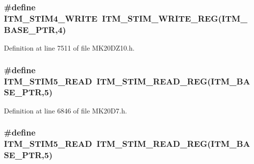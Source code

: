 \subsubsection[{\texorpdfstring{I\+T\+M\+\_\+\+S\+T\+I\+M4\+\_\+\+W\+R\+I\+TE}{ITM_STIM4_WRITE}}]{\setlength{\rightskip}{0pt plus 5cm}\#define I\+T\+M\+\_\+\+S\+T\+I\+M4\+\_\+\+W\+R\+I\+TE~{\bf I\+T\+M\+\_\+\+S\+T\+I\+M\+\_\+\+W\+R\+I\+T\+E\+\_\+\+R\+EG}({\bf I\+T\+M\+\_\+\+B\+A\+S\+E\+\_\+\+P\+TR},4)}\hypertarget{group___i_t_m___register___accessor___macros_ga15f21956568cb77bc35327f9f4742b0f}{}\label{group___i_t_m___register___accessor___macros_ga15f21956568cb77bc35327f9f4742b0f}


Definition at line 7511 of file M\+K20\+D\+Z10.\+h.

\subsubsection[{\texorpdfstring{I\+T\+M\+\_\+\+S\+T\+I\+M5\+\_\+\+R\+E\+AD}{ITM_STIM5_READ}}]{\setlength{\rightskip}{0pt plus 5cm}\#define I\+T\+M\+\_\+\+S\+T\+I\+M5\+\_\+\+R\+E\+AD~{\bf I\+T\+M\+\_\+\+S\+T\+I\+M\+\_\+\+R\+E\+A\+D\+\_\+\+R\+EG}({\bf I\+T\+M\+\_\+\+B\+A\+S\+E\+\_\+\+P\+TR},5)}\hypertarget{group___i_t_m___register___accessor___macros_ga71729386b6675413e54bbae85ca5f6b4}{}\label{group___i_t_m___register___accessor___macros_ga71729386b6675413e54bbae85ca5f6b4}


Definition at line 6846 of file M\+K20\+D7.\+h.

\subsubsection[{\texorpdfstring{I\+T\+M\+\_\+\+S\+T\+I\+M5\+\_\+\+R\+E\+AD}{ITM_STIM5_READ}}]{\setlength{\rightskip}{0pt plus 5cm}\#define I\+T\+M\+\_\+\+S\+T\+I\+M5\+\_\+\+R\+E\+AD~{\bf I\+T\+M\+\_\+\+S\+T\+I\+M\+\_\+\+R\+E\+A\+D\+\_\+\+R\+EG}({\bf I\+T\+M\+\_\+\+B\+A\+S\+E\+\_\+\+P\+TR},5)}\hypertarget{group___i_t_m___register___accessor___macros_ga71729386b6675413e54bbae85ca5f6b4}{}\label{group___i_t_m___register___accessor___macros_ga71729386b6675413e54bbae85ca5f6b4}


